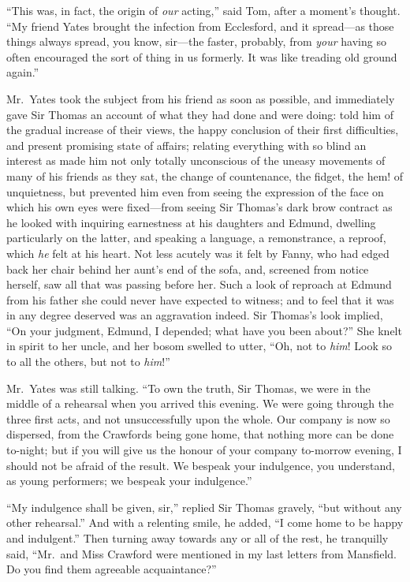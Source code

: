 ``This was, in fact, the origin of \emph{our} acting,'' said Tom,
after a moment's thought.  ``My friend Yates brought the
infection from Ecclesford, and it spread---as those things
always spread, you know, sir---the faster, probably,
from \emph{your} having so often encouraged the sort of thing
in us formerly.  It was like treading old ground again.''

Mr.\ Yates took the subject from his friend as soon as possible,
and immediately gave Sir Thomas an account of what they
had done and were doing:  told him of the gradual
increase of their views, the happy conclusion of their
first difficulties, and present promising state of affairs;
relating everything with so blind an interest as made him
not only totally unconscious of the uneasy movements of many
of his friends as they sat, the change of countenance,
the fidget, the hem! of unquietness, but prevented him
even from seeing the expression of the face on which his
own eyes were fixed---from seeing Sir Thomas's dark brow
contract as he looked with inquiring earnestness at his
daughters and Edmund, dwelling particularly on the latter,
and speaking a language, a remonstrance, a reproof,
which \emph{he} felt at his heart.  Not less acutely was it
felt by Fanny, who had edged back her chair behind her
aunt's end of the sofa, and, screened from notice herself,
saw all that was passing before her.  Such a look
of reproach at Edmund from his father she could never
have expected to witness; and to feel that it was in any
degree deserved was an aggravation indeed.  Sir Thomas's
look implied, ``On your judgment, Edmund, I depended;
what have you been about?''  She knelt in spirit to her uncle,
and her bosom swelled to utter, ``Oh, not to \emph{him}!
Look so to all the others, but not to \emph{him}!''

Mr.\ Yates was still talking.  ``To own the truth, Sir Thomas,
we were in the middle of a rehearsal when you arrived
this evening.  We were going through the three first acts,
and not unsuccessfully upon the whole.  Our company is
now so dispersed, from the Crawfords being gone home,
that nothing more can be done to-night; but if you will
give us the honour of your company to-morrow evening,
I should not be afraid of the result.  We bespeak
your indulgence, you understand, as young performers;
we bespeak your indulgence.''

``My indulgence shall be given, sir,'' replied Sir
Thomas gravely, ``but without any other rehearsal.''
And with a relenting smile, he added, ``I come home
to be happy and indulgent.''  Then turning away towards
any or all of the rest, he tranquilly said, ``Mr.\ and Miss
Crawford were mentioned in my last letters from Mansfield.
Do you find them agreeable acquaintance?''

